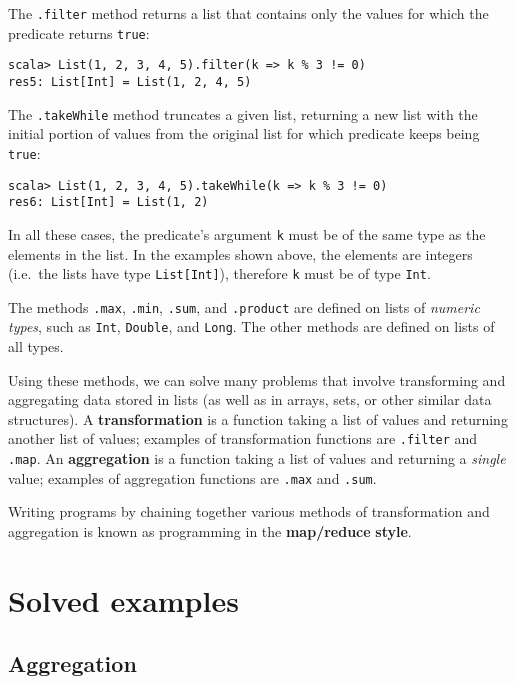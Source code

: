 The \lstinline!.filter! method returns a list that contains only
the values for which the predicate returns \texttt{}\lstinline!true!:

\begin{lstlisting}
scala> List(1, 2, 3, 4, 5).filter(k => k % 3 != 0)
res5: List[Int] = List(1, 2, 4, 5)
\end{lstlisting}

The \texttt{}\lstinline!.takeWhile! method truncates a given list,
returning a new list with the initial portion of values from the original
list for which predicate keeps being \lstinline!true!:
\begin{lstlisting}
scala> List(1, 2, 3, 4, 5).takeWhile(k => k % 3 != 0)
res6: List[Int] = List(1, 2)
\end{lstlisting}

In all these cases, the predicate's argument \lstinline!k! must be
of the same type as the elements in the list. In the examples shown
above, the elements are integers (i.e.\ the lists have type \lstinline!List[Int]!),
therefore \texttt{}\lstinline!k! must be of type \lstinline!Int!.

The methods \lstinline!.max!, \lstinline!.min!, \lstinline!.sum!,
and \texttt{}\lstinline!.product! are defined on lists of \emph{numeric
types}, such as \lstinline!Int!, \lstinline!Double!, and \lstinline!Long!.
The other methods are defined on lists of all types.

Using these methods, we can solve many problems that involve transforming
and aggregating data stored in lists (as well as in arrays, sets,
or other similar data structures). A \textbf{transformation}
is a function taking a list of values and returning another list of
values; examples of transformation functions are \texttt{}\lstinline!.filter!
and \lstinline!.map!. An \textbf{aggregation}
is a function taking a list of values and returning a \emph{single}
value; examples of aggregation functions are \texttt{}\lstinline!.max!
and \lstinline!.sum!.

Writing programs by chaining together various methods of transformation
and aggregation is known as programming in the \textbf{map/reduce}
\textbf{style}.

\section{Solved examples}

\subsection{Aggregation }

